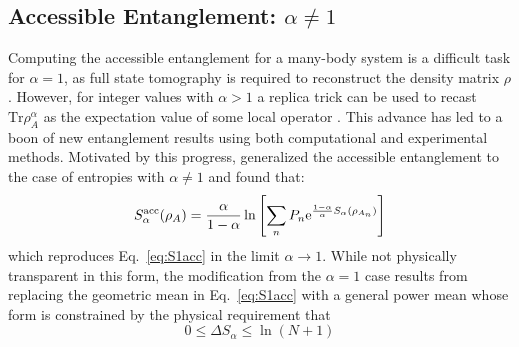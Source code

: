 \subsection{\ren Accessible Entanglement: $\alpha \ne 1$}

Computing the accessible entanglement for a many-body system is a difficult task for $\alpha=1$, as full state tomography is required to reconstruct the density matrix $\rho$. However, for integer values with $\alpha > 1$ a replica trick can be used to recast $\mathrm{Tr} \rho_A^\alpha$ as the expectation value of some local operator \cite{Calabrese:2004hl}. This advance has led to a boon of new entanglement results using both computational \cite{Hastings:2010dc, Humeniuk:2012cq, McMinis:2013dp, Herdman:2014ey, Drut:2015fs} and experimental \cite{Daley:2012bd, Islam:2015cm, Kaufman:2016ep, Pichler:2016ec, Linke:2017tf, Lukin:2018wg} methods.  Motivated by this progress, \cite{Barghathi_2018} generalized the accessible entanglement to the case of \ren entropies with $\alpha \ne 1$ and found that:
%
\begin{equation}
S_{\alpha}^{{\rm acc}} (\rho_A) = \frac{\alpha}{1-\alpha}\ln\left[ \sum_{n} P_n \mathrm{e}^{\frac{1-\alpha}{\alpha} S_{\alpha}(\rho_{A_n})}\right]
\label{eq:S_alpha_acc}
\end{equation} 
%
which reproduces Eq.~\eqref{eq:S1acc} in the limit $\alpha \to 1$. While not physically transparent in this form, the modification from the $\alpha=1$ case results from replacing the geometric mean in Eq.~\eqref{eq:S1acc} with a general power mean whose form is constrained by the physical requirement that
%
\begin{equation}
 0 \le \Delta S_\alpha \le \ln (N+1)
\label{eq:DeltaS_alpha_inq}
\end{equation}
